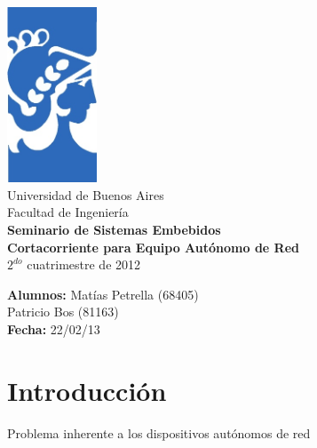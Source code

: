 \documentclass[a4paper,12pt]{article}
\begin{document}
\thispagestyle{empty}

\begin{center}
	\includegraphics[width=0.2\textwidth,angle=0]{./imagenes/logo-facu.png}\\
	\huge{{Universidad de Buenos Aires}}\\
	\huge{{Facultad de Ingeniería}}\\
	\vspace{2.2cm}
	\Huge{\textbf{Seminario de Sistemas Embebidos}}\\
	\vspace{0.5cm}
	\Large{\textbf{Cortacorriente para Equipo Autónomo de Red}}\\
	\vspace{1.5cm}
	\Large{$2^{do}$ cuatrimestre de 2012}\\
	\vspace{2cm}	
\end{center}

\vfill
\begin{flushright}
		\textbf{Alumnos:}  Matías Petrella (68405)\\
		 Patricio Bos (81163)\\
		\textbf{Fecha:}  22/02/13\\
\end{flushright}
\newpage



\tableofcontents
\thispagestyle{empty}
\newpage

\section{Introducción}
Problema inherente a los dispositivos autónomos de red\\
 
\end{document}
